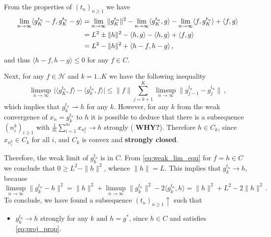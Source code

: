\documentclass[a4paper]{article}
\newcommand{\Hcal}{\mathcal{H}}
\begin{document}
From the properties of $(t_n)_{n\geq1}$ we have
\begin{align} \label{eq:weak_lim_equ}
  \lim_{n\to \infty}
    \langle g^{t_n}_K - f, g^{t_n}_K - g \rangle
    &= \lim_{n\to \infty} \|g^{t_n}_K\|^2
      - \lim_{n\to \infty} \langle g^{t_n}_K, g \rangle
      - \lim_{n\to \infty} \langle f, g^{t_n}_K \rangle
      + \langle f, g \rangle
    \notag \\
    &= L^2 \pm \|h\|^2 - \langle h, g \rangle - \langle h, g \rangle
      + \langle f, g \rangle
    \notag \\
    &= L^2 - \|h\|^2 + \langle h - f, h - g \rangle
  \,,
\end{align}
and thus $\langle h - f, h - g \rangle \leq 0$ for any $f \in C$.

Next, for any $f\in \Hcal$ and $k=1..K$ we have the following inequality
\begin{equation*}
  \limsup_{n\to\infty}\,
    \bigl\lvert
      \langle g^{t_n}_K, f \rangle - \langle g^{t_n}_k, f \rangle
    \bigr\rvert
    \leq
      \|f\| \sum_{j=k+1}^K \limsup_{n\to\infty}
        \bigl \|g^{t_n}_{j-1} - g^{t_n}_j \bigr \|
      \,,
\end{equation*}
which implies that $g^{t_n}_k \rightharpoonup h$ for any $k$. However, for any $k$
from the weak convergence of $x_n = g^{t_n}_k$ to $h$ it is possible to deduce that
there is a subsequence $(n^k_i)_{i\geq1}$ with $\tfrac1m \sum_{i=1}^m x_{n^k_i} \to h$
strongly ({\bf \color{red} WHY?}). Therefore $h \in C_k$, since $x_{n^k_i} \in C_k$
for all $i$, and $C_k$ is convex and {\bf strongly closed}.

Therefore, the weak limit of $g^{t_n}_k$ is in $C$. From \eqref{eq:weak_lim_equ}
for $f = h \in C$ we conclude that $0 \geq L^2 - \|h\|^2$, whence $\|h\| = L$.
This implies that $g^{t_n}_k \to h$, because
\begin{equation*}
  \limsup_{n\to\infty} \| g^{t_n}_k - h \|^2
    = \| h \|^2 + \limsup_{n\to\infty} \|g^{t_n}_k\|^2 - 2\langle g^{t_n}_k, h \rangle
    = \| h \|^2 + L^2 - 2 \| h \|^2
    \,.
\end{equation*}
To conclude, we have found a subsequence $(t_n)_{n\geq1} \uparrow$ such that
\begin{itemize}
  \item $g^{t_n}_k \to h$ strongly for any $k$ and $h=g^*$, since $h \in C$ and
  satisfies \eqref{eq:proj_prop}.
\end{itemize}

\end{document}
